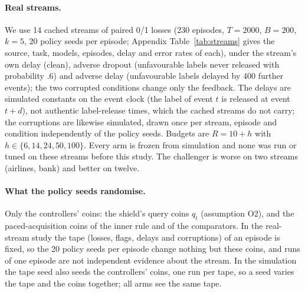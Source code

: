 \documentclass[10pt]{article}
\theoremstyle{plain}
\theoremstyle{definition}
\begin{document}
\paragraph{Real streams.}
We use 14 cached streams of paired 0/1 losses (230 episodes, $T=2000$, $B=200$, $k=5$, 20 policy seeds per episode; Appendix Table~\ref{tab:streams} gives the source, task, models, episodes, delay and error rates of each), under the stream's own delay (clean), adverse dropout (unfavourable labels never released with probability $.6$) and adverse delay (unfavourable labels delayed by 400 further events); the two corrupted conditions change only the feedback. The delays are simulated constants on the event clock (the label of event $t$ is released at event $t+d$), not authentic label-release times, which the cached streams do not carry; the corruptions are likewise simulated, drawn once per stream, episode and condition independently of the policy seeds. Budgets are $R=10+h$ with $h\in\{6,14,24,50,100\}$. Every arm is frozen from simulation and none was run or tuned on these streams before this study. The challenger is worse on two streams (airlines, bank) and better on twelve.

\paragraph{What the policy seeds randomise.}
Only the controllers' coins: the shield's query coins $q_t$ (assumption O2), and the paced-acquisition coins of the inner rule and of the comparators. In the real-stream study the tape (losses, flags, delays and corruptions) of an episode is fixed, so the 20 policy seeds per episode change nothing but these coins, and runs of one episode are not independent evidence about the stream. In the simulation the tape seed also seeds the controllers' coins, one run per tape, so a seed varies the tape and the coins together; all arms see the same tape.

\begin{table}[t]
\caption{Registered confirmation C1--C6 (simulation, \NRunsPerArm{} runs per arm). Source: \texttt{confirm\_summary.json}.}\label{tab:confirm}
\centering\small
\resizebox{\linewidth}{!}{}
\end{table}

\begin{table}[t]
\caption{Simulation, $R=20$, pooled over \NRegimes{} regimes. $J$ is mean cost; ``vs never'' is the relative difference in $J$; harm quantiles are of $\sup_tH_t$. The last two columns give the exceedance rate of $R=20$ pooled and in the worst regime. Full sampling has no violations; paced sampling has rare exceedances, while each heuristic comparator has a higher pooled rate.}\label{tab:sim}
\centering\small

\end{table}
\end{document}
